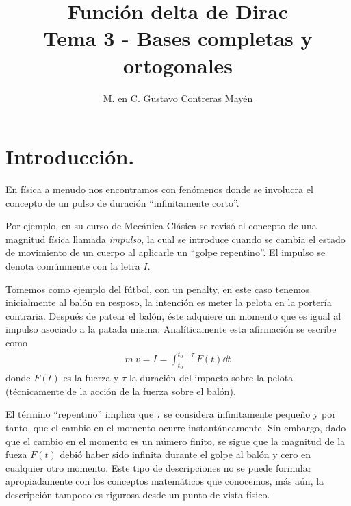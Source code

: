 
\usepackage{apacite}
\title{Función delta de Dirac \\ \large {Tema 3 - Bases completas y ortogonales} \vspace{-3ex}}
\author{M. en C. Gustavo Contreras Mayén}
\date{ }

\vspace{-4cm}
\maketitle
\fontsize{14}{14}\selectfont
\tableofcontents
\newpage
\section{Introducción.}
En física a menudo nos encontramos con fenómenos donde se involucra el concepto de un pulso de duración \enquote{infinitamente corto}.
\par
Por ejemplo, en su curso de Mecánica Clásica se revisó el concepto de una magnitud física llamada \emph{impulso}, la cual se introduce cuando se cambia el estado de movimiento de un cuerpo al aplicarle un \enquote{golpe repentino}. El impulso se denota comúnmente con la letra $I$.
\par
Tomemos como ejemplo del fútbol, con un penalty, en este caso tenemos inicialmente al balón en resposo, la intención es meter la pelota en la portería contraria. Después de patear el balón, éste adquiere un momento que es igual al impulso asociado a la patada misma. Analíticamente esta afirmación se escribe como
\begin{align*}
m \: v = I = \int_{t_{0}}^{t_{0} + \tau} F(t) \dd{t}
\end{align*}
donde $F(t)$ es la fuerza y $\tau$ la duración del impacto sobre la pelota (técnicamente de la acción de la fuerza sobre el balón).
\par
El término \enquote{repentino} implica que $\tau$ se considera infinitamente pequeño y por tanto, que el cambio en el momento ocurre instantáneamente. Sin embargo, dado que el cambio en el momento es un número finito, se sigue que la magnitud de la fueza $F(t)$ debió haber sido infinita durante el golpe al balón y cero en cualquier otro momento. Este
tipo de descripciones no se puede formular apropiadamente con los conceptos matemáticos que conocemos, más aún, la descripción tampoco es rigurosa desde un punto de vista físico.
